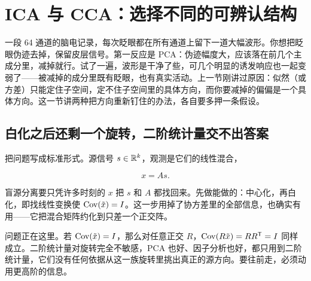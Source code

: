 \section{ICA 与 CCA：选择不同的可辨认结构}
\label{sec:13-Machine-Learning/04-Dimensionality-Reduction/07}

一段 64 通道的脑电记录，每次眨眼都在所有通道上留下一道大幅波形。你想把眨眼伪迹去掉，保留皮层信号。第一反应是 PCA：伪迹幅度大，应该落在前几个主成分里，减掉就行。试了一遍，波形是干净了些，可几个明显的诱发响应也一起变弱了——被减掉的成分里既有眨眼，也有真实活动。上一节刚讲过原因：似然（或方差）只能定住子空间，定不住子空间里的具体方向，而你要减掉的偏偏是一个具体方向。这一节讲两种把方向重新钉住的办法，各自要多押一条假设。

\subsection{白化之后还剩一个旋转，二阶统计量交不出答案}

把问题写成标准形式。源信号 \(s\in\mathbb{R}^k\)，观测是它们的线性混合，

\[
x = As .
\]

盲源分离要只凭许多时刻的 \(x\) 把 \(s\) 和 \(A\) 都找回来。先做能做的：中心化，再白化，即找线性变换使 \(\operatorname{Cov}(\tilde x)=I\)。这一步用掉了协方差里的全部信息，也确实有用——它把混合矩阵约化到只差一个正交阵。

问题正在这里。若 \(\operatorname{Cov}(\tilde x)=I\)，那么对任意正交 \(R\)，\(\operatorname{Cov}(R\tilde x)=RR^{\mathsf{T}}=I\) 同样成立。二阶统计量对旋转完全不敏感，PCA 也好、因子分析也好，都只用到二阶统计量，它们没有任何依据从这一族旋转里挑出真正的源方向。要往前走，必须动用更高阶的信息。

